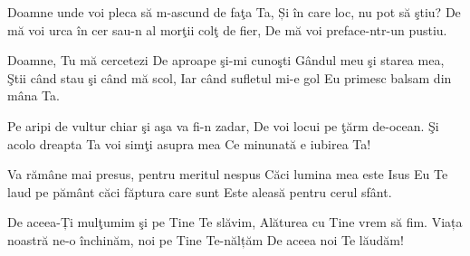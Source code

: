 
\beginverse
Doamne unde voi pleca să m-ascund de faţa Ta,
Și în care loc, nu pot să ştiu?
De mă voi urca în cer sau-n al morţii colţ de fier,
De mă voi preface-ntr-un pustiu.
\endverse

\beginchorus
Doamne, Tu mă cercetezi
De aproape şi-mi cunoşti
Gândul meu şi starea mea,
Ştii când stau şi când mă scol,
Iar când sufletul mi-e gol
Eu primesc balsam din mâna Ta.
\endchorus

\beginverse
Pe aripi de vultur chiar şi aşa va fi-n zadar,
De voi locui pe ţărm de-ocean.
Şi acolo dreapta Ta voi simţi asupra mea
Ce minunată e iubirea Ta!
\endverse

\beginverse
Va rămâne mai presus, pentru meritul nespus
Căci lumina mea este Isus
Eu Te laud pe pământ căci făptura care sunt
Este aleasă pentru cerul sfânt.
\endverse

\beginverse
De aceea-Ți mulţumim şi pe Tine Te slăvim,
Alăturea cu Tine vrem să fim.
Viața noastră ne-o închinăm, noi pe Tine Te-nălțăm
De aceea noi Te lăudăm! 
\endverse

\endsong